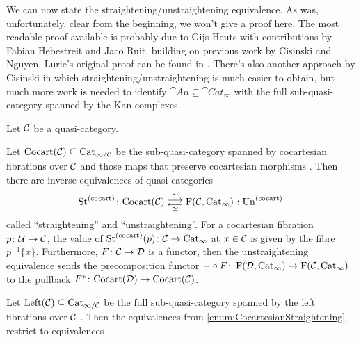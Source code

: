 We can now state the straightening/unstraightening equivalence. As was, unfortunately, clear from the beginning, we won't give a proof here. The most readable proof available is probably due to Gijs Heuts \cite{HeutsStraightening} with contributions by Fabian Hebestreit and Jaco Ruit, building on previous work by Cisinski and Nguyen. Lurie's original proof can be found in \cite[\S\href{https://people.math.harvard.edu/~lurie/papers/HTT.pdf\#section.3.2}{3.2}]{HTT}. There's also another approach by Cisinski \cite{Cisinski} in which straightening/unstraightening is much easier to obtain, but much more work is needed to identify $\cat{An}\subseteq \cat{Cat}_\infty$ with the full sub-quasi-category spanned by the Kan complexes.
\begin{thm}\label{thm:Straightening}
	Let $\mathcal{C}$ be a quasi-category.
	\begin{alphanumerate}
		\item Let $\mathrm{Cocart}(\mathcal{C})\subseteq\mathrm{Cat}_{\infty/\mathcal{C}}$ be the  sub-quasi-category spanned by cocartesian fibrations over $\mathcal{C}$ and those maps that preserve cocartesian morphisms . Then there are inverse equivalences of quasi-categories\label{enum:CocartesianStraightening}
		\begin{equation*}
			\operatorname{St}^{(\mathrm{cocart})}\colon \cat{Cocart}(\Cc) \underset{\simeq}{\mathrel{\smash{\underset{\smash{\raisebox{0.35em}{$\longleftarrow$}}}{\overset{\smash{\raisebox{-0.35em}{$\overset{\simeq}{\longrightarrow}$}}}{\phantom{\longrightarrow}}}}}}\F(\Cc,\cat{Cat}_\infty)\noloc \operatorname{Un}^{(\mathrm{cocart})}\vphantom{\overset{\simeq}{\overline{x}}}
		\end{equation*}
		called \enquote{straightening} and \enquote{unstraightening}. For a cocartesian fibration $p\colon \mathcal{U}\rightarrow \mathcal{C}$, the value of $\operatorname{St}^{(\mathrm{cocart})}(p)\colon \mathcal{C}\rightarrow\mathrm{Cat}_\infty$ at $x\in \mathcal{C}$ is given by the fibre $p^{-1}\{x\}$. Furthermore, $F\colon \mathcal{C}\rightarrow \mathcal{D}$ is a functor, then the unstraightening equivalence sends the precomposition functor $-\circ F\colon \operatorname{F}(\mathcal{D},\mathrm{Cat}_\infty)\rightarrow \operatorname{F}(\mathcal{C},\mathrm{Cat}_\infty)$ to the pullback $F^*\colon \mathrm{Cocart}(\mathcal{D})\rightarrow\mathrm{Cocart}(\mathcal{C})$.
		\item Let $\mathrm{Left}(\mathcal{C})\subseteq \mathrm{Cat}_{\infty/\mathcal{C}}$ be the full sub-quasi-category spanned by the left fibrations over $\mathcal{C}$ . Then the equivalences from \cref{enum:CocartesianStraightening} restrict to equivalences\label{enum:LeftStraightening}

\end{alphanumerate}
\end{thm}
